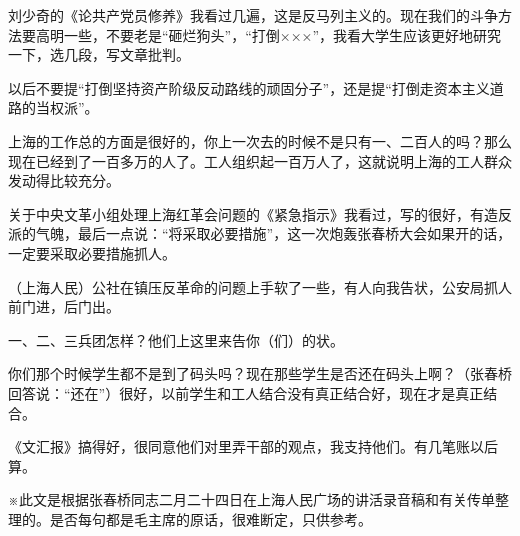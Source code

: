 刘少奇的《论共产党员修养》我看过几遍，这是反马列主义的。现在我们的斗争方法要高明一些，不要老是“砸烂狗头”，“打倒×××”，我看大学生应该更好地研究一下，选几段，写文章批判。

以后不要提“打倒坚持资产阶级反动路线的顽固分子”，还是提“打倒走资本主义道路的当权派”。

上海的工作总的方面是很好的，你上一次去的时候不是只有一、二百人的吗？那么现在已经到了一百多万的人了。工人组织起一百万人了，这就说明上海的工人群众发动得比较充分。

关于中央文革小组处理上海红革会问题的《紧急指示》我看过，写的很好，有造反派的气魄，最后一点说：“将采取必要措施”，这一次炮轰张春桥大会如果开的话，一定要采取必要措施抓人。

（上海人民）公社在镇压反革命的问题上手软了一些，有人向我告状，公安局抓人前门进，后门出。

一、二、三兵团怎样？他们上这里来告你（们）的状。

你们那个时候学生都不是到了码头吗？现在那些学生是否还在码头上啊？（张春桥回答说：“还在”）很好，以前学生和工人结合没有真正结合好，现在才是真正结合。

《文汇报》搞得好，很同意他们对里弄干部的观点，我支持他们。有几笔账以后算。

※此文是根据张春桥同志二月二十四日在上海人民广场的讲活录音稿和有关传单整理的。是否每句都是毛主席的原话，很难断定，只供参考。


